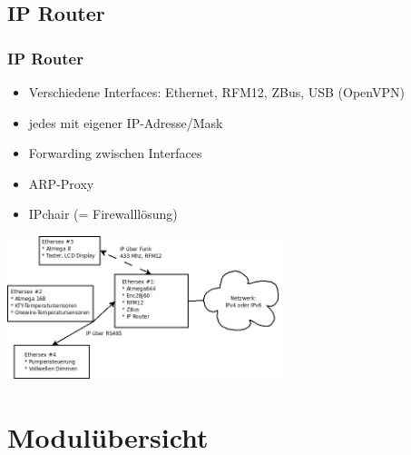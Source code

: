 \documentclass[utf8, xcolor=dvipsnames]{beamer}
\begin{document}
\subsection{IP Router}
\begin{frame}
  \frametitle{IP Router}
  
  \begin{itemize}
  \item Verschiedene Interfaces: Ethernet, RFM12, ZBus, USB (OpenVPN)
  \item jedes mit eigener IP-Adresse/Mask
  \item Forwarding zwischen Interfaces
  \item ARP-Proxy
  \item IPchair (= Firewalllösung)
  \end{itemize}

\end{frame}


\begin{frame}
  
  \begin{center}
    \includegraphics[width=8cm]{network-dia.png}
  \end{center}

\end{frame}


\section{Modulübersicht}



\end{document}
